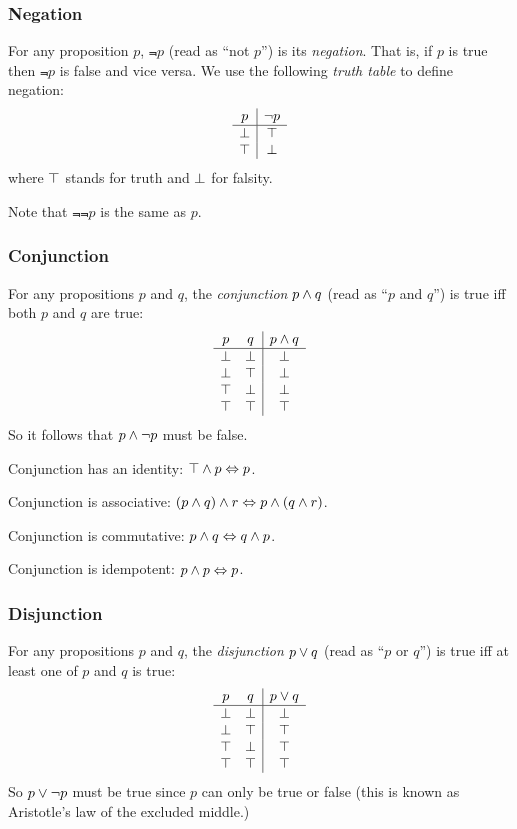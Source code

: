 \subsubsection{Negation}

For any proposition $p$, $\Not{p}$ (read as ``not $p$'') is its
\emph{negation}.  That is, if $p$ is true then $\Not{p}$ is false and
vice versa.  We use the following \emph{truth table} to define negation:
\[
\begin{array}{c|c}
p       & \neg{}p \\
\hline
\perp  & \top  \\
\top   & \perp \\
\end{array}
\]
where $\top$ stands for truth and $\perp$ for falsity.

Note that $\Not{\Not{p}}$ is the same as $p$.

\subsubsection{Conjunction}

For any propositions $p$ and $q$, the \emph{conjunction} $p \wedge q$
(read as ``$p$ and $q$'') is true iff both $p$ and $q$ are true:
\[
\begin{array}{cc|c}
p       & q       & p \wedge q \\
\hline
\perp  & \perp  & \perp \\
\perp  & \top   & \perp \\
\top   & \perp  & \perp \\
\top   & \top   & \top \\
\end{array}
\]
So it follows that $p \wedge \neg{}p$ must be false.

Conjunction has an identity: $\top \wedge p \Leftrightarrow p$.

Conjunction is associative: $(p \wedge q) \wedge r \Leftrightarrow p \wedge (q \wedge r)$.

Conjunction is commutative: $p \wedge q \Leftrightarrow q \wedge p$.

Conjunction is idempotent: $p \wedge p \Leftrightarrow p$.

\subsubsection{Disjunction}

For any propositions $p$ and $q$, the \emph{disjunction} $p \vee q$
(read as ``$p$ or $q$'') is true iff at least one of $p$ and $q$ is
true:
\[
\begin{array}{cc|c}
p       & q       & p \vee q \\
\hline
\perp  & \perp  & \perp \\
\perp  & \top   & \top \\
\top   & \perp  & \top \\
\top   & \top   & \top \\
\end{array}
\]
So $p \vee \neg{}p$ must be true since $p$ can only be true or false
(this is known as Aristotle's law of the excluded middle.)

